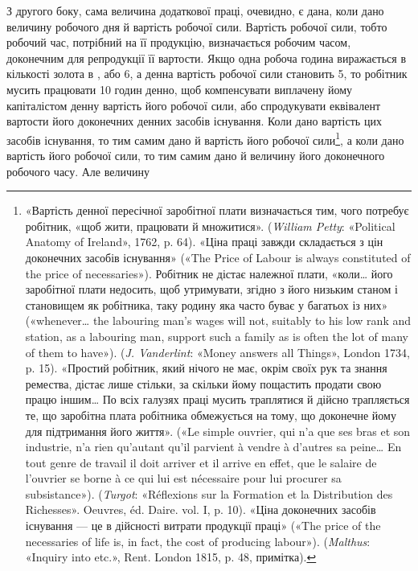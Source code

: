 З другого боку, сама величина додаткової праці, очевидно,
є дана, коли дано величину робочого дня й вартість робочої
сили. Вартість робочої сили, тобто робочий час, потрібний на її
продукцію, визначається робочим часом, доконечним для репродукції
її вартости. Якщо одна робоча година виражається в
кількості золота в , або 6, а денна вартість робочої
сили становить 5, то робітник мусить працювати
10 годин денно, щоб компенсувати виплачену йому капіталістом
денну вартість його робочої сили, або спродукувати еквівалент
вартости його доконечних денних засобів існування. Коли дано
вартість цих засобів існування, то тим самим дано й вартість його
робочої сили\footnote{
«Вартість денної пересічної заробітної плати визначається тим,
чого потребує робітник, «щоб жити, працювати й множитися». (\emph{William
Petty}: «Political Anatomy of Ireland», 1762, p. 64). «Ціна праці
завжди складається з цін доконечних засобів існування» («The Price of
Labour is always constituted of the price of necessaries»). Робітник не дістає
належної плати, «коли\dots{} його заробітної плати недосить, щоб утримувати,
згідно з його низьким станом і становищем як робітника, таку родину
яка часто буває у багатьох із них» («whenever\dots{} the labouring man’s
wages will not, suitably to his low rank and station, as a labouring man,
support such a family as is often the lot of many of them to have»).
(\emph{J. Vanderlint}: «Money answers all Things», London 1734, p. 15). «Простий
робітник, який нічого не має, окрім своїх рук та знання ремества, дістає
лише стільки, за скільки йому пощастить продати свою працю іншим\dots{}
По всіх галузях праці мусить траплятися й дійсно трапляється те, що
заробітна плата робітника обмежується на тому, що доконечне йому
для підтримання його життя». («Le simple ouvrier, qui n’a que ses bras
et son industrie, n’a rien qu’autant qu’il parvient à vendre à d’autres sa
peine\dots{} En tout genre de travail il doit arriver et il arrive en effet, que le
salaire de l’ouvrier se borne à ce qui lui est nécessaire pour lui procurer
sa subsistance»). (\emph{Turgot}: «Réflexions sur la Formation et la Distribution
des Richesses». Oeuvres, éd. Daire. vol. I, p. 10). «Ціна доконечних
засобів існування — це в дійсності витрати продукції праці» («The
price of the necessaries of life is, in fact, the cost of producing labour»).
(\emph{Malthus}: «Inquiry into etc.», Rent. London 1815, p. 48, примітка).
}, а коли дано вартість його робочої сили, то тим
самим дано й величину його доконечного робочого часу. Але величину
